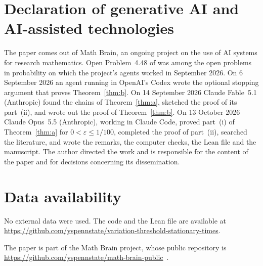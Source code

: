 \documentclass[11pt]{amsart}
\numberwithin{equation}{section}
\begin{document}
\section*{Declaration of generative AI and AI-assisted technologies}
The paper comes out of Math Brain, an ongoing project on the use of AI systems for research mathematics. Open Problem~4.48 of \cite{AF} was among the open problems in probability on which the project's agents worked in September 2026. On 6 September 2026 an agent running in OpenAI's Codex wrote the optional stopping argument that proves Theorem~\ref{thm:b}. On 14 September 2026 Claude Fable~5.1 (Anthropic) found the chains of Theorem~\ref{thm:a}, sketched the proof of its part~(ii), and wrote out the proof of Theorem~\ref{thm:b}. On 13 October 2026 Claude Opus~5.5 (Anthropic), working in Claude Code, proved part~(i) of Theorem~\ref{thm:a} for $0<\varepsilon\le1/100$, completed the proof of part~(ii), searched the literature, and wrote the remarks, the computer checks, the Lean file and the manuscript. The author directed the work and is responsible for the content of the paper and for decisions concerning its dissemination.

\section*{Data availability}
No external data were used. The code and the Lean file are available at\\ \url{https://github.com/yspennstate/variation-threshold-stationary-times}.

The paper is part of the Math Brain project, whose public repository is \url{https://github.com/yspennstate/math-brain-public}~\cite{MathBrainRepo}.
\end{document}
